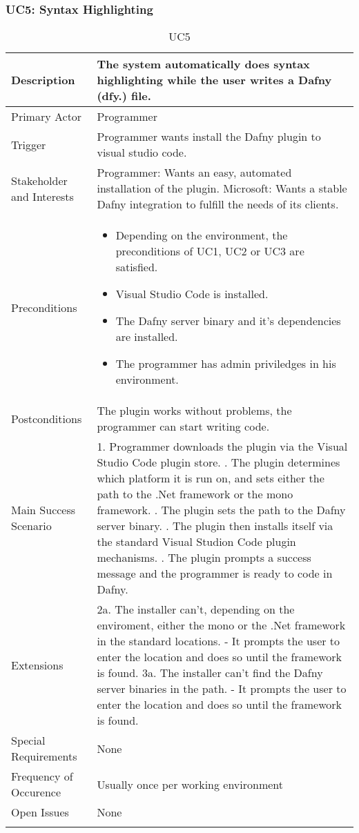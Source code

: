 \subsubsection{UC5: Syntax Highlighting}
\begin{longtable}{l | p{} }
	Description & The system automatically does syntax highlighting while the user writes a Dafny (dfy.) file.\\ \hline
	Primary Actor & Programmer\\ \hline
	Trigger & Programmer wants install the Dafny plugin to visual studio code.\\ \hline
	Stakeholder and Interests & Programmer: Wants an easy, automated installation of the plugin. \newline Microsoft: Wants a stable Dafny integration to fulfill the needs of its clients.\\ \hline
	Preconditions &\begin{itemize}
		\item Depending on the environment, the preconditions of UC1, UC2 or UC3 are satisfied.
		\item Visual Studio Code is installed.
		\item The Dafny server binary and it's dependencies are installed.
		\item The programmer has admin priviledges in his environment.
	\end{itemize}\\ \hline
	Postconditions & The plugin works without problems, the programmer can start writing code.\\ \hline
	Main Success Scenario & 
	1. Programmer downloads the plugin via the Visual Studio Code plugin store. \newline
	2. The plugin determines which platform it is run on, and sets either the path to the .Net framework or the mono framework. \newline
	3. The plugin sets the path to the Dafny server binary. \newline
	4. The plugin then installs itself via the standard Visual Studion Code plugin mechanisms. \newline
	5. The plugin prompts a success message and the programmer is ready to code in Dafny.\\ \hline
	Extensions & 
	2a. The installer can't, depending on the enviroment, either the mono or the .Net framework in the standard locations. \newline 
	- It prompts the user to enter the location and does so until the framework is found. \newline
	3a. The installer can't find the Dafny server binaries in the path. \newline
	- It prompts the user to enter the location and does so until the framework is found.\\ \hline
	Special Requirements & None\\ \hline
	Frequency of Occurence & Usually once per working environment\\ \hline
	Open Issues & None \\ \hline
	\caption{UC5}
\end{longtable}